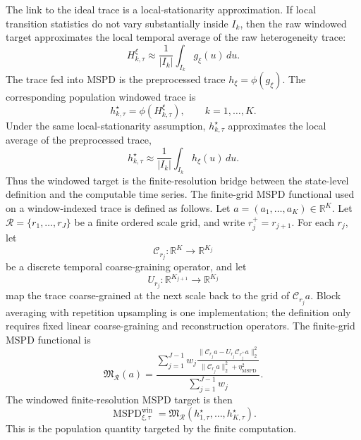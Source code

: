 The link to the ideal trace is a local-stationarity approximation.  If local transition statistics do not vary substantially inside \(I_k\), then the raw windowed target approximates the local temporal average of the raw heterogeneity trace:
\begin{equation}
H_{k,\tau}^{\xi}
  \approx
  \frac{1}{|I_k|}
  \int_{I_k}g_\xi(u)\,du.
  \label{eq:window-approx-local-average}
\end{equation}
The trace fed into MSPD is the preprocessed trace \(h_\xi=\phi(g_\xi)\).  The corresponding population windowed trace is
\begin{equation}
  h_{k,\tau}^{\star}
  =
  \phi(H_{k,\tau}^{\xi}),
  \qquad k=1,\ldots,K.
  \label{eq:population-windowed-trace}
\end{equation}
Under the same local-stationarity assumption, \(h_{k,\tau}^{\star}\) approximates the local average of the preprocessed trace,
\begin{equation}
h_{k,\tau}^{\star}
  \approx
  \frac{1}{|I_k|}
  \int_{I_k}h_\xi(u)\,du.
  \label{eq:window-trace-approx}
\end{equation}
Thus the windowed target is the finite-resolution bridge between the state-level definition and the computable time series.
The finite-grid MSPD functional used on a window-indexed trace is defined as follows.  Let \(a=(a_1,\ldots,a_K)\in\mathbb R^K\).  Let \(\mathcal R=\{r_1,\ldots,r_J\}\) be a finite ordered scale grid, and write \(r_j^+=r_{j+1}\).  For each \(r_j\), let
\[
  \mathcal C_{r_j}:\mathbb R^K\to\mathbb R^{K_j}
\]
be a discrete temporal coarse-graining operator, and let
\[
  U_{r_j}:\mathbb R^{K_{j+1}}\to\mathbb R^{K_j}
\]
map the trace coarse-grained at the next scale back to the grid of \(\mathcal C_{r_j}a\).  Block averaging with repetition upsampling is one implementation; the definition only requires fixed linear coarse-graining and reconstruction operators.  The finite-grid MSPD functional is
\begin{equation}
\mathfrak M_{\mathcal R}(a)
  =
  \frac{
    \sum_{j=1}^{J-1}w_j
    \frac{
      \|\mathcal C_{r_j}a-U_{r_j}\mathcal C_{r_j^+}a\|_2^2
    }{
      \|\mathcal C_{r_j}a\|_2^2+\eta_{\mathrm{MSPD}}^2
    }
  }{
    \sum_{j=1}^{J-1}w_j
  }.
  \label{eq:finite-grid-functional}
\end{equation}
The windowed finite-resolution MSPD target is then
\begin{equation}
\operatorname{MSPD}^{\mathrm{win}}_{\xi,\tau}
  =
  \mathfrak M_{\mathcal R}
  (h_{1,\tau}^{\star},\ldots,h_{K,\tau}^{\star}).
  \label{eq:windowed-mspd-target}
\end{equation}
This is the population quantity targeted by the finite computation.

